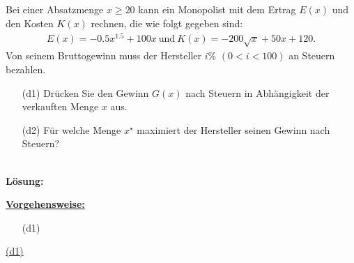 \newpage
\subsection*{}
Bei einer Absatzmenge $ x \geq 20  $ kann ein Monopolist mit dem Ertrag $ E(x) $ und den Kosten $ K(x) $ rechnen, die wie folgt gegeben sind:
\begin{align*}
	E(x) = -0.5 x^{1.5} +100 x \ \textrm{und} \ K(x) = -200\sqrt{x} + 50 x +120.
\end{align*}
Von seinem Bruttogewinn muss der Hersteller $ i \% $  $ (0 < i < 100) $ an Steuern bezahlen.
\begin{enumerate}
	\item[(d1)]
	Drücken Sie den Gewinn $ G(x) $ nach Steuern in Abhängigkeit der verkauften Menge $ x $ aus.
	\item[(d2)] 
	Für welche Menge $ x^\star $ maximiert der Hersteller seinen Gewinn nach Steuern?
\end{enumerate}
\ \\
\textbf{Lösung:}
\begin{mdframed}
	\underline{\textbf{Vorgehensweise:}}
	\begin{enumerate}
		\item[(d1)] 
	\end{enumerate}
\end{mdframed}


\underline{(d1) }\\





